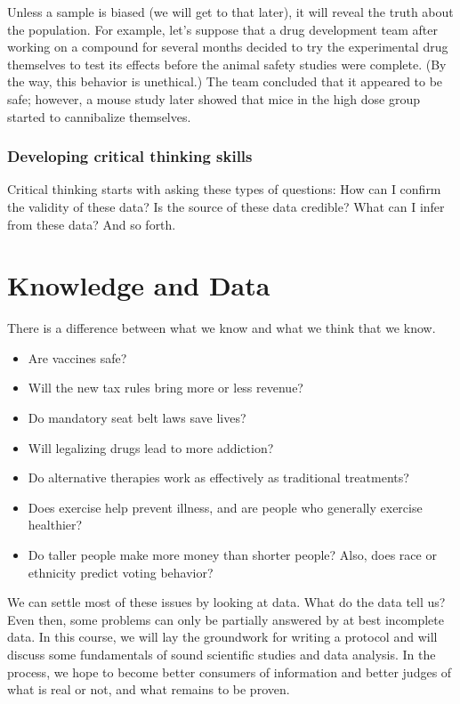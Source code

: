 \documentclass[11pt]{book}\usepackage[]{graphicx}\usepackage[]{color}
\begin{document}
Unless a sample is biased (we will get to that later), it will reveal the truth about the population.  For example, let's suppose that a drug development team after working on a compound for several months decided to try the experimental drug themselves to test its effects before the animal safety studies were complete.  (By the way, this behavior is unethical.)  The team concluded that it appeared to be safe; however, a mouse study later showed that mice in the high dose group started to cannibalize themselves.   

\subsubsection{Developing critical thinking skills}

Critical thinking starts with asking these types of questions: How can I confirm the validity of these data? Is the source of these data credible?  What can I infer from these data?  And so forth.

\section{Knowledge and Data}

There is a difference between what we know and what we think that we know.  

\begin{itemize}
\item Are vaccines safe?  
\item Will the new tax rules bring more or less revenue?  
\item Do mandatory seat belt laws save lives?   
\item Will legalizing drugs lead to more addiction?  
\item Do alternative therapies work as effectively as traditional treatments?  
\item Does exercise help prevent illness, and are people who generally exercise healthier? 
\item Do taller people make more money than shorter people?  \citep{naranjo2018} Also, does race or ethnicity predict voting behavior?
\end{itemize}

We can settle most of these issues by looking at data.  What do the data tell us?  Even then, some problems can only be partially answered by at best incomplete data.  In this course, we will lay the groundwork for writing a protocol and will discuss some fundamentals of sound scientific studies and data analysis.  In the process, we hope to become better consumers of information and better judges of what is real or not, and what remains to be proven.
\end{document}
